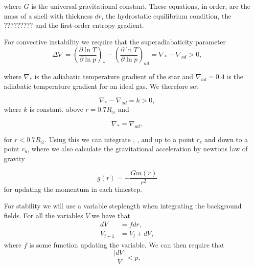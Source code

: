\documentclass{article}
\begin{document}
where $G$ is the universal gravitational constant. These equations, in order, are the mass of a shell with thickness $dr$, the hydrostatic equilibrium condition, the ????????? and the first-order entropy gradient.

For convective instability we require that the superadiabaticity parameter 
\begin{equation*}
    \Delta\nabla = \left(\frac{\partial\ln T}{\partial\ln p} \right)_{*} - \left(\frac{\partial\ln T}{\partial\ln p} \right)_{ad} = \nabla_{*} -\nabla_{ad} > 0,
\end{equation*}

where $\nabla_{*}$ is the adiabatic temperature gradient of the star and $\nabla_{ad}=0.4$ is the adiabatic temperature gradient for an ideal gas. We therefore set 

\begin{equation*}
    \nabla_{*} -\nabla_{ad} = k > 0,
\end{equation*}
where $k$ is constant, above $r=0.7 R_{\odot}$ and

\begin{equation*}
    \nabla_{*} = \nabla_{ad},
\end{equation*}

for $r<0.7 R_{\odot}$. Using this we can integrate \label{eq:dm_dr}, \label{eq:dp_dr}, \label{eq:dT_dr} and \label{eq:ds_dr} up to a point $r_e$ and down to a point $r_b$, where we also calculate the gravitational acceleration by newtons law of gravity

\begin{equation}
    g(r) = - \frac{Gm(r)}{r^2}
\end{equation}
for updating the momentum in each timestep. 

For stability we will use a variable steplength when integrating the background fields. For all the variables $V$ we have that
\begin{align*}
    dV &= fdr,\\
    V_{i+1} &= V_i + dV,
\end{align*}
where $f$ is some function updating the variable. We can then require that
\begin{equation*}
    \frac{|dV|}{V} < p,
\end{equation*}
\end{document}
